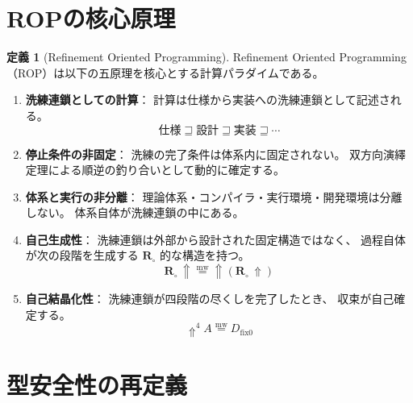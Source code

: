 \documentclass[11pt,a4paper]{article}
\theoremstyle{definition}
\newtheorem{definition}{定義}[section]
\newcommand{\mweq}{\mathrel{\overset{\mathrm{mw}}{=}}}
\newcommand{\dfix}{D_{\mathrm{fix}0}}
\newcommand{\metanegation}{\Uparrow}
\newcommand{\Rmw}{\mathbf{R}_{\circ}}
\begin{document}
\section{ROPの核心原理}

\begin{definition}[Refinement Oriented Programming]
Refinement Oriented Programming（ROP）は以下の五原理を核心とする計算パラダイムである。

\begin{enumerate}
  \item \textbf{洗練連鎖としての計算}：
    計算は仕様から実装への洗練連鎖として記述される。
    \begin{equation}
      \text{仕様} \sqsupseteq \text{設計} \sqsupseteq \text{実装} \sqsupseteq \cdots
    \end{equation}
  
  \item \textbf{停止条件の非固定}：
    洗練の完了条件は体系内に固定されない。
    双方向演繹定理による順逆の釣り合いとして動的に確定する。
  
  \item \textbf{体系と実行の非分離}：
    理論体系・コンパイラ・実行環境・開発環境は分離しない。
    体系自体が洗練連鎖の中にある。
  
  \item \textbf{自己生成性}：
    洗練連鎖は外部から設計された固定構造ではなく、
    過程自体が次の段階を生成する $\Rmw$ 的な構造を持つ。
    \begin{equation}
      \Rmw\,\metanegation \mweq \metanegation(\Rmw\,\metanegation)
    \end{equation}
  
  \item \textbf{自己結晶化性}：
    洗練連鎖が四段階の尽くしを完了したとき、
    収束が自己確定する。
    \begin{equation}
      \metanegation^4 A \mweq \dfix
    \end{equation}
\end{enumerate}
\end{definition}

\section{型安全性の再定義}
\end{document}
